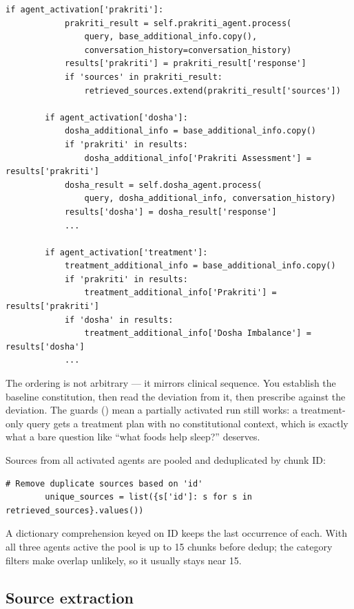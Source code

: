 \begin{lstlisting}[style=py,firstnumber=52]
        if agent_activation['prakriti']:
            prakriti_result = self.prakriti_agent.process(
                query, base_additional_info.copy(),
                conversation_history=conversation_history)
            results['prakriti'] = prakriti_result['response']
            if 'sources' in prakriti_result:
                retrieved_sources.extend(prakriti_result['sources'])

        if agent_activation['dosha']:
            dosha_additional_info = base_additional_info.copy()
            if 'prakriti' in results:
                dosha_additional_info['Prakriti Assessment'] = results['prakriti']
            dosha_result = self.dosha_agent.process(
                query, dosha_additional_info, conversation_history)
            results['dosha'] = dosha_result['response']
            ...

        if agent_activation['treatment']:
            treatment_additional_info = base_additional_info.copy()
            if 'prakriti' in results:
                treatment_additional_info['Prakriti'] = results['prakriti']
            if 'dosha' in results:
                treatment_additional_info['Dosha Imbalance'] = results['dosha']
            ...
\end{lstlisting}

The ordering is not arbitrary --- it mirrors clinical sequence. You establish the baseline constitution, then read the deviation from it, then prescribe against the deviation. The guards () mean a partially activated run still works: a treatment-only query gets a treatment plan with no constitutional context, which is exactly what a bare question like ``what foods help sleep?'' deserves.

Sources from all activated agents are pooled and deduplicated by chunk ID:

\begin{lstlisting}[style=py,firstnumber=79]
        # Remove duplicate sources based on 'id'
        unique_sources = list({s['id']: s for s in retrieved_sources}.values())
\end{lstlisting}

A dictionary comprehension keyed on ID keeps the last occurrence of each. With all three agents active the pool is up to 15 chunks before dedup; the category filters make overlap unlikely, so it usually stays near 15.

\subsection{Source extraction}


